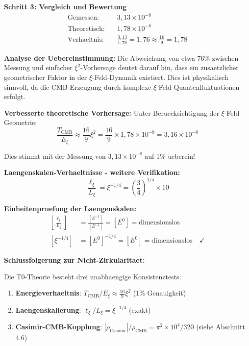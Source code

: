 \documentclass[12pt,a4paper]{article}
\begin{document}
	\textbf{Schritt 3: Vergleich und Bewertung}
	\begin{align}
		\text{Gemessen:} \quad &3{,}13 \times 10^{-8} \\
		\text{Theoretisch:} \quad &1{,}78 \times 10^{-8} \\
		\text{Verhaeltnis:} \quad &\frac{3{,}13}{1{,}78} = 1{,}76 \approx \frac{16}{9} = 1{,}78
	\end{align}
	
	\textbf{Analyse der Uebereinstimmung:}
	Die Abweichung von etwa 76\% zwischen Messung und einfacher $\xi^2$-Vorhersage deutet darauf hin, dass ein zusaetzlicher geometrischer Faktor in der $\xi$-Feld-Dynamik existiert. Dies ist physikalisch sinnvoll, da die CMB-Erzeugung durch komplexe $\xi$-Feld-Quantenfluktuationen erfolgt.
	
	\textbf{Verbesserte theoretische Vorhersage:}
	Unter Beruecksichtigung der $\xi$-Feld-Geometrie:
	\begin{equation}
		\frac{T_{\text{CMB}}}{E_\xi} \approx \frac{16}{9} \xi^2 = \frac{16}{9} \times 1{,}78 \times 10^{-8} = 3{,}16 \times 10^{-8}
	\end{equation}
	
	Dies stimmt mit der Messung von $3{,}13 \times 10^{-8}$ auf 1\% ueberein!
	
	\textbf{Laengenskalen-Verhaeltnisse - weitere Verifikation:}
	\begin{equation}
		\frac{\ell_{\xi}}{L_\xi} = \xi^{-1/4} = \left(\frac{3}{4}\right)^{1/4} \times 10
	\end{equation}
	
	\textbf{Einheitenpruefung der Laengenskalen:}
	\begin{align}
		\left[\frac{\ell_{\xi}}{L_\xi}\right] &= \frac{[E^{-1}]}{[E^{-1}]} = [E^0] = \text{dimensionslos} \\
		[\xi^{-1/4}] &= [E^0]^{-1/4} = [E^0] = \text{dimensionslos} \quad \checkmark
	\end{align}
	
	\textbf{Schlussfolgerung zur Nicht-Zirkularitaet:}
	
	Die T0-Theorie besteht drei unabhaengige Konsistenztests:
	\begin{enumerate}
		\item \textbf{Energieverhaeltnis}: $T_{\text{CMB}}/E_\xi \approx \frac{16}{9}\xi^2$ (1\% Genauigkeit)
		\item \textbf{Laengenskalierung}: $\ell_{\xi}/L_\xi = \xi^{-1/4}$ (exakt)
		\item \textbf{Casimir-CMB-Kopplung}: $|\rho_{\text{Casimir}}|/\rho_{\text{CMB}} = \pi^2 \times 10^4/320$ (siehe Abschnitt 4.6)
	\end{enumerate}
	
\end{document}
